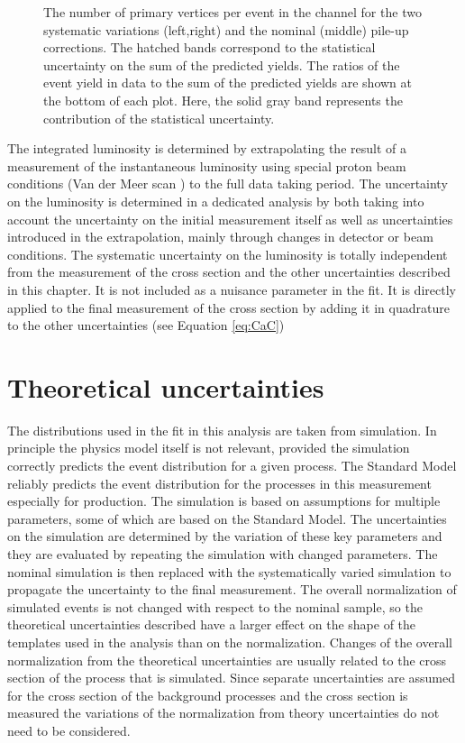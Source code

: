 \begin{figure}[htbp!]
\begin{center}
\caption{The number of primary vertices per event in the \emu channel for the two systematic variations (left,right) and the nominal (middle) pile-up corrections.
The hatched bands correspond to the statistical uncertainty on the sum of the predicted yields. 
        The ratios of the event yield in data to the sum of the predicted yields are
        shown at the bottom of each plot. Here, the solid gray band
        represents the contribution of the statistical uncertainty.
  \label{fig:control_var_PU}}
  \end{center}
\end{figure}


The integrated luminosity is determined by extrapolating the result of a measurement \cite{CMS-PAS-LUM-17-001} of the instantaneous luminosity using special proton beam conditions (Van der Meer scan \cite{Zanetti:1357856}) to the full data taking period.
The uncertainty on the luminosity is determined in a dedicated analysis by both taking into account the uncertainty on the initial measurement itself as well as uncertainties
introduced in the extrapolation, mainly through changes in detector or beam conditions.
The systematic uncertainty on the luminosity is totally independent from the measurement of the \ttbar cross section and the other uncertainties described in this chapter.
It is not included as a nuisance parameter in the fit. It is directly applied to the final measurement of the \ttbar cross section by adding it in quadrature to the other uncertainties (see Equation \ref{eq:CaC})

\section{Theoretical uncertainties}
\label{sec:theo_uncert}

The distributions used in the fit in this analysis are taken from simulation. In principle the physics model itself is not relevant, provided the simulation correctly predicts the event distribution for a given process.
The Standard Model reliably predicts the event distribution for the processes in this measurement especially for \ttbar production.
The simulation is based on assumptions for multiple parameters, some of which are based on the Standard Model. The uncertainties on the simulation are determined by the variation of these key parameters and they are
evaluated by repeating the simulation with changed parameters. The nominal simulation is then replaced with the systematically varied simulation to propagate the uncertainty to the final measurement.
The overall normalization of simulated \ttbar events is not changed with respect to the nominal sample, so the theoretical uncertainties described have a larger effect on the shape of the templates used
in the analysis than on the normalization. Changes of the overall normalization from the theoretical uncertainties are usually related to the cross section of the process that is simulated. Since separate uncertainties are
assumed for the cross section of the background processes and the \ttbar cross section is measured the variations of the normalization from theory uncertainties do not need to be considered.

